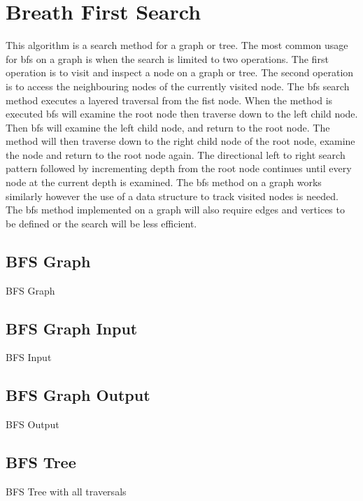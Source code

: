 \section{Breath First Search}
This algorithm is a search method for a graph or tree. 
The most common usage for bfs on a graph is when the search is limited to two operations. 
The first operation is to visit and inspect a node on a graph or tree.
The second operation is to access the neighbouring nodes of the currently visited node.
The bfs search method executes a layered traversal from the fist node.
When the method is executed bfs will examine the root node then traverse down to the left child node.
Then bfs will examine the left child node, and return to the root node.
The method will then traverse down to the right child node of the root node, examine the node and return to the root node again.
The directional left to right search pattern followed by incrementing depth from the root node continues until every node at the current depth is examined.
The bfs method on a graph works similarly however the use of a data structure to track visited nodes is needed.
The bfs method implemented on a graph will also require edges and vertices to be defined or the search will be less efficient. 

  

\subsection{BFS Graph}
BFS Graph 

\subsection{BFS Graph Input}
BFS Input

\subsection{BFS Graph Output}
BFS Output

\subsection{BFS Tree}
BFS Tree with all traversals 

